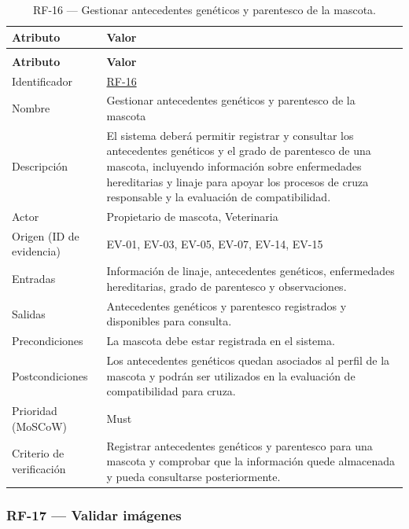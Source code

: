 \documentclass[journal,onecolumn]{IEEEtran}
\makeatletter
\newenvironment{atributos}[2]{%
	\small
	\begin{longtable}{@{}>{\raggedright\arraybackslash}p{4.2cm} >{\raggedright\arraybackslash}p{11.2cm}@{}}
		\caption{#2}\label{tab:#1}\\
		\toprule
		\textbf{Atributo} & \textbf{Valor} \\
		\midrule
		\endfirsthead
		\multicolumn{2}{@{}l}{\small\itshape (continuación)}\\
		\toprule
		\textbf{Atributo} & \textbf{Valor} \\
		\midrule
		\endhead
		\bottomrule
		\endlastfoot
	}{%
	\end{longtable}
	\normalsize
}
\makeatother
\begin{document}
	\begin{atributos}{RF-16}{RF-16 --- Gestionar antecedentes genéticos y parentesco de la mascota.}
		Identificador & \hyperref[tab:RF-16]{RF-16} \\
		Nombre & Gestionar antecedentes genéticos y parentesco de la mascota \\
		Descripción & El sistema deberá permitir registrar y consultar los antecedentes genéticos y el grado de parentesco de una mascota, incluyendo información sobre enfermedades hereditarias y linaje para apoyar los procesos de cruza responsable y la evaluación de compatibilidad. \\
		Actor & Propietario de mascota, Veterinaria \\
		Origen (ID de evidencia) & EV-01, EV-03, EV-05, EV-07, EV-14, EV-15 \\
		Entradas & Información de linaje, antecedentes genéticos, enfermedades hereditarias, grado de parentesco y observaciones. \\
		Salidas & Antecedentes genéticos y parentesco registrados y disponibles para consulta. \\
		Precondiciones & La mascota debe estar registrada en el sistema. \\
		Postcondiciones & Los antecedentes genéticos quedan asociados al perfil de la mascota y podrán ser utilizados en la evaluación de compatibilidad para cruza. \\
		Prioridad (MoSCoW) & Must \\
		Criterio de verificación & Registrar antecedentes genéticos y parentesco para una mascota y comprobar que la información quede almacenada y pueda consultarse posteriormente. \\
	\end{atributos}
	
	\subsubsection{RF-17 --- Validar imágenes}
	
\end{document}
